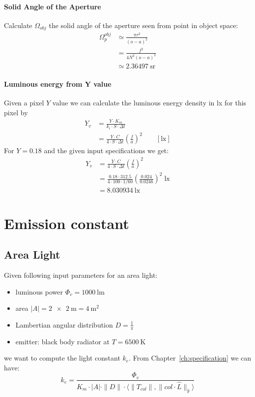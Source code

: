 \fi

\paragraph{Solid Angle of the Aperture}
Calculate $\Omega_{obj}$ the solid angle of the aperture seen from point in object space:
\begin{align*}
\Omega_p^{obj} &\simeq \frac{\pi r^2}{(o-a)^2}\\
&= \frac{f^2}{4N^2(o-a)^2}\\
&\simeq  \SI{2.36497}{\steradian}
\end{align*}

\paragraph{Luminous energy from Y value}

Given a pixel $Y$ value we can calculate the luminous energy density in \si{\lux} for this pixel by
\begin{align*}
Y_v &= \frac{Y\cdot K_m}{ k_i\cdot S \cdot \Delta t} \\
&= \frac{Y\cdot C}{ 4\cdot S \cdot \Delta t} \left(\frac{f}{a}\right)^2
\qquad [\si{\lux}]
\end{align*}
For $Y=0.18$ and the given input specifications we get:
\begin{align*}
Y_v &= \frac{Y\cdot C}{ 4\cdot S \cdot \Delta t} \left(\frac{f}{a}\right)^2 \\
&= \frac{0.18\cdot 312.5}{ 4\cdot 100 \cdot 1/60} \left(\frac{0.024}{0.0246}\right)^2 \;\si{\lux} \\
&= \SI{8.030934}{\lux}
\end{align*}

\section{Emission constant}

\subsection{Area Light}
Given following input parameters for an area light:
\begin{itemize}
\item luminous power $\Phi_v=\SI{1000}{\lumen}$
\item area $|A|= \SI{2 x 2}{\meter} = \SI{4}{\square\meter}$
\item Lambertian angular distribution $D = \frac1{\pi}$
\item emitter: black body radiator at $T=\SI{6500}{\kelvin}$
\end{itemize}
we want to compute the light constant $k_e$. From Chapter~\ref{ch:specification} we can  have:
\begin{displaymath}
 k_e = \frac{\Phi_v}{K_m \cdot |A| \cdot \|D\| \cdot \langle \|T_{col}\|, \|col\cdot\hat{L}\|_{\bar y} \rangle }
\end{displaymath}


